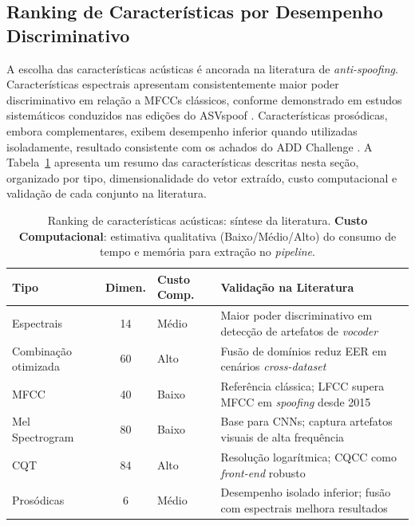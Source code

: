 \documentclass[12pt,a4paper]{article}
\begin{document}
\subsection{Ranking de Características por Desempenho Discriminativo}

A escolha das características acústicas é ancorada na literatura de
\textit{anti-spoofing}. Características espectrais apresentam consistentemente
maior poder discriminativo em relação a MFCCs clássicos, conforme demonstrado
em estudos sistemáticos conduzidos nas edições do ASVspoof
\cite{sahidullah2015comparison, todisco2016new, todisco2019asvspoof}.
Características prosódicas, embora complementares, exibem desempenho inferior
quando utilizadas isoladamente, resultado consistente com os achados do ADD
Challenge \cite{yi2022add}.
A Tabela~\ref{tab:ranking_features} apresenta um resumo das características
descritas nesta seção, organizado por tipo, dimensionalidade do vetor extraído,
custo computacional e validação de cada conjunto na literatura.

\begin{table}[H]
\centering
\caption{Ranking de características acústicas: síntese da literatura.
\textbf{Custo Computacional}: estimativa qualitativa (Baixo/Médio/Alto) do
consumo de tempo e memória para extração no \textit{pipeline}.}
\label{tab:ranking_features}
\small\singlespacing
\begin{tabular}{p{2.8cm}cp{2.0cm}p{4.5cm}}
\toprule
\textbf{Tipo} & \textbf{Dimen.} & \textbf{Custo Comp.} &
\textbf{Validação na Literatura} \\
\midrule
Espectrais
  & 14 & Médio
  & Maior poder discriminativo em detecção de artefatos de
    \textit{vocoder}~\cite{bartusiak2022, todisco2016new} \\
\addlinespace
Combinação otimizada
  & 60 & Alto
  & Fusão de domínios reduz EER em cenários
    \textit{cross-dataset}~\cite{wang2024asvspoof5} \\
\addlinespace
MFCC
  & 40 & Baixo
  & Referência clássica; LFCC supera MFCC em \textit{spoofing}
    desde 2015~\cite{sahidullah2015comparison, todisco2019asvspoof} \\
\addlinespace
Mel Spectrogram
  & 80 & Baixo
  & Base para CNNs; captura artefatos visuais de alta
    frequência~\cite{jung2022aasist, tak2021rawnet2} \\
\addlinespace
CQT
  & 84 & Alto
  & Resolução logarítmica; CQCC como \textit{front-end}
    robusto~\cite{todisco2016new} \\
\addlinespace
Prosódicas
  & 6 & Médio
  & Desempenho isolado inferior; fusão com espectrais melhora
    resultados~\cite{yi2022add, muller2022warning} \\
\bottomrule
\end{tabular}
\end{table}
\end{document}
